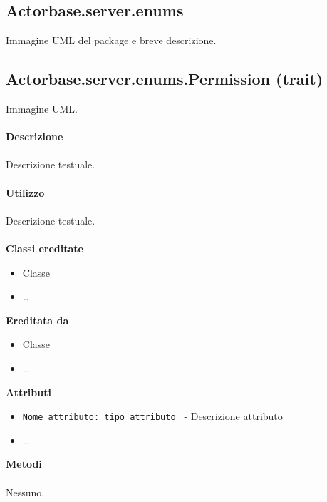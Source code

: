 \documentclass[a4paper]{article}
\begin{document}
	\subsection{Actorbase.server.enums}
		Immagine UML del package e breve descrizione.
		
	\subsection{Actorbase.server.enums.Permission (trait)}
		Immagine UML.
		\\ \\
		\textbf{Descrizione}
			\\ \\
			Descrizione testuale.
			\\ \\
		\textbf{Utilizzo}
			\\ \\
			Descrizione testuale.
			\\ \\
		\textbf{Classi ereditate}
			\begin{itemize}
				\item Classe
				\item \dots
			\end{itemize}
		\textbf{Ereditata da}
			\begin{itemize}
				\item Classe
				\item \dots
			\end{itemize}
		\textbf{Attributi}
			\begin{itemize}
				\item \texttt{Nome attributo: tipo attributo } - Descrizione attributo
				\item \dots
			\end{itemize}
		\textbf{Metodi}
			\\ \\
			Nessuno.
		
\end{document}
